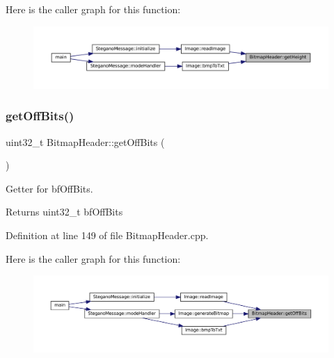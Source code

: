 Here is the caller graph for this function\+:
\nopagebreak
\begin{figure}[H]
\begin{center}
\leavevmode
\includegraphics[width=350pt]{classBitmapHeader_a106f72d6c256327342029edf8e18bde1_icgraph}
\end{center}
\end{figure}
\mbox{\label{classBitmapHeader_a70702e4d8aba2a3502f776f73bfecde8}} 
\subsubsection{\texorpdfstring{getOffBits()}{getOffBits()}}
{\footnotesize\ttfamily uint32\+\_\+t Bitmap\+Header\+::get\+Off\+Bits (\begin{DoxyParamCaption}{ }\end{DoxyParamCaption})}



Getter for bf\+Off\+Bits. 

\begin{DoxyReturn}{Returns}
uint32\+\_\+t bf\+Off\+Bits 
\end{DoxyReturn}


Definition at line 149 of file Bitmap\+Header.\+cpp.

Here is the caller graph for this function\+:
\nopagebreak
\begin{figure}[H]
\begin{center}
\leavevmode
\includegraphics[width=350pt]{classBitmapHeader_a70702e4d8aba2a3502f776f73bfecde8_icgraph}
\end{center}
\end{figure}
\mbox{\label{classBitmapHeader_a53309aa035484da90e8170f9950aa86b}} 
